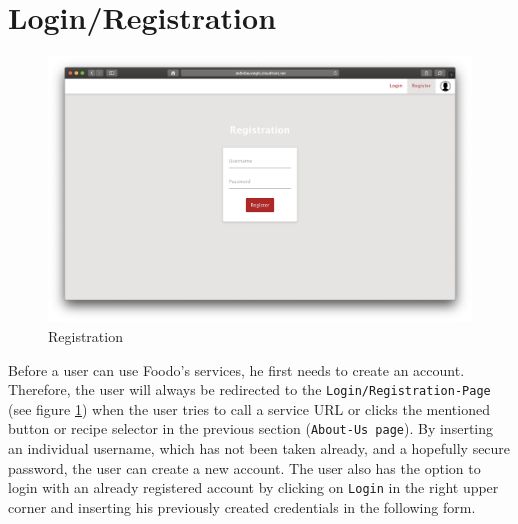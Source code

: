 \section*{Login/Registration}
\vspace{-2em}
\begin{figure}[H]
	\captionsetup{justification=centering}
	\begin{center}
		\includegraphics[scale=0.28]{Ressourcen/img/screenshots/screenshotD.png}
		\vspace{-3em}
		\caption{Registration}
		\label{fig:registration}
	\end{center}
\end{figure}
Before a user can use Foodo’s services, he first needs to create an account. Therefore, the user will always be redirected to the \texttt{Login/Registration-Page} (see figure \ref{fig:registration}) when the user tries to call a service URL or clicks the mentioned button or recipe selector in the previous section (\texttt{About-Us page}). By inserting an individual username, which has not been taken already, and a hopefully secure password, the user can create a new account. The user also has the option to login with an already registered account by clicking on \texttt{Login} in the right upper corner and inserting his previously created credentials in the following form.
